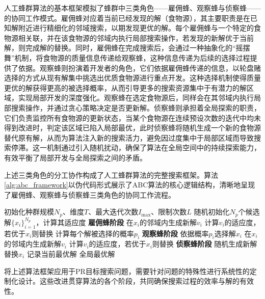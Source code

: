 人工蜂群算法的基本框架模拟了蜂群中三类角色——雇佣蜂、观察蜂与侦察蜂——的协同工作模式。雇佣蜂对应着当前已经发现的解（食物源），其主要职责是在已知解附近进行精细化的邻域搜索，以期发现更优的解。每个雇佣蜂与一个特定的食物源相关联，并在该食物源的邻域内执行局部搜索操作，若发现的新解优于当前解，则完成解的替换。同时，雇佣蜂在完成搜索后，会通过一种抽象化的“摇摆舞”机制，将食物源的质量信息传递给观察蜂，这种信息传递为后续的选择过程提供了依据。观察蜂则扮演着开发者的角色，它们依据雇佣蜂传递的信息，以轮盘赌选择的方式从现有解集中挑选出优质食物源进行重点开发。这种选择机制使得质量更优的解获得更高的被选择概率，从而引导更多的搜索资源集中于有潜力的解区域，实现局部开发的深度强化。观察蜂在选定食物源后，同样会在其邻域内执行局部搜索操作，并通过贪心策略决定是否更新解。侦察蜂则承担着全局探索的职责，它们负责监控所有食物源的更新状态，当某个食物源在连续预设次数的迭代中均未得到改进时，判定该区域已陷入局部最优，此时侦察蜂将随机生成一个新的食物源替代原有解，从而为算法注入新的搜索活力，避免因过度集中于局部区域而导致搜索停滞。这一机制通过引入随机扰动，确保了算法在全局空间中的持续探索能力，有效平衡了局部开发与全局探索之间的矛盾。

上述三类角色的分工协作构成了人工蜂群算法的完整搜索框架。算法\ref{alg:abc_framework}以伪代码形式展示了ABC算法的核心逻辑结构，清晰地呈现了雇佣蜂、观察蜂与侦察蜂三类角色的协同工作流程。

\begin{algorithm}[H]
	\caption{人工蜂群算法基本框架}
	\label{alg:abc_framework}
	\begin{algorithmic}[1]
		\STATE 初始化种群规模$N_p$、维度$T$、最大迭代次数$I_{\max}$、限制次数$L$
		\STATE 随机初始化$N_p$个候选解$\{x_i\}_{i=1}^{N_p}$，计算其适应度
		\STATE \textbf{雇佣蜂阶段}
		\STATE 在$x_i$的邻域内生成新解$v_i$
		\STATE 计算$v_i$的适应度，若优于$x_i$则替换
		\ENDFOR
		\STATE 计算每个解被选择的概率$p_i$
		\STATE \textbf{观察蜂阶段}
		\STATE 依据概率$p_i$选择解$x_i$
		\STATE 在$x_i$的邻域内生成新解$v_i$
		\STATE 计算$v_i$的适应度，若优于$x_i$则替换
		\ENDFOR
		\STATE \textbf{侦察蜂阶段}
		\STATE 随机生成新解替换$x_i$
		\ENDIF
		\ENDFOR
		\STATE 记录当前最优解
		\ENDWHILE
		\RETURN 全局最优解
	\end{algorithmic}
\end{algorithm}

将上述算法框架应用于PR目标搜索问题，需要针对问题的特殊性进行系统性的定制化设计。这些改进贯穿算法的各个阶段，共同确保搜索过程的效率与解的有效性。

